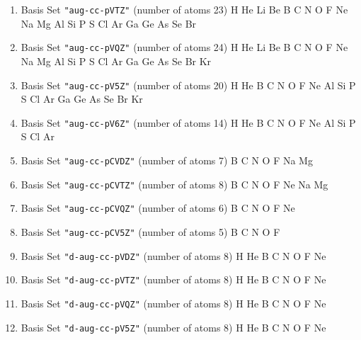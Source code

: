 \begin{enumerate}
\item Basis Set \verb#"aug-cc-pVTZ"# (number of atoms 23)  \newline
  H He Li Be B C N O F Ne Na Mg Al Si P S Cl Ar Ga Ge As Se Br


\item Basis Set \verb#"aug-cc-pVQZ"# (number of atoms 24)  \newline
  H He Li Be B C N O F Ne Na Mg Al Si P S Cl Ar Ga Ge As Se Br Kr


\item Basis Set \verb#"aug-cc-pV5Z"# (number of atoms 20)  \newline
  H He B C N O F Ne Al Si P S Cl Ar Ga Ge As Se Br Kr


\item Basis Set \verb#"aug-cc-pV6Z"# (number of atoms 14)  \newline
  H He B C N O F Ne Al Si P S Cl Ar


\item Basis Set \verb#"aug-cc-pCVDZ"# (number of atoms 7)  \newline
  B C N O F Na Mg


\item Basis Set \verb#"aug-cc-pCVTZ"# (number of atoms 8)  \newline
  B C N O F Ne Na Mg

\item Basis Set \verb#"aug-cc-pCVQZ"# (number of atoms 6)  \newline
  B C N O F Ne


\item Basis Set \verb#"aug-cc-pCV5Z"# (number of atoms 5)  \newline
  B C N O F


\item Basis Set \verb#"d-aug-cc-pVDZ"# (number of atoms 8)  \newline
  H He B C N O F Ne


\item Basis Set \verb#"d-aug-cc-pVTZ"# (number of atoms 8)  \newline
  H He B C N O F Ne


\item Basis Set \verb#"d-aug-cc-pVQZ"# (number of atoms 8)  \newline
  H He B C N O F Ne


\item Basis Set \verb#"d-aug-cc-pV5Z"# (number of atoms 8)  \newline
  H He B C N O F Ne



\end{enumerate}
